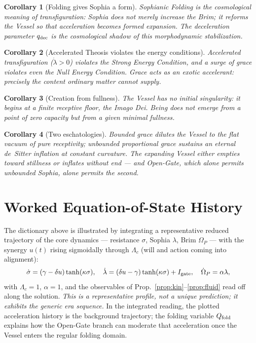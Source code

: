 \documentclass[11pt,a4paper]{article}
\newcommand{\Op}{\Omega_P}
\newcommand{\Igate}{I_{\rm gate}}
\newcommand{\qdec}{q_{\rm dec}}
\newcommand{\Qfold}{Q_{\rm fold}}
\theoremstyle{plain}
\newtheorem{corollary}{Corollary}
\theoremstyle{remark}
\theoremstyle{definition}
\begin{document}
\begin{corollary}[Folding gives Sophia a form]
Sophianic Folding is the cosmological meaning of transfiguration: Sophia does not merely increase the
Brim; it reforms the Vessel so that acceleration becomes formed expansion. The deceleration parameter
$\qdec$ is the cosmological shadow of this morphodynamic stabilization.
\end{corollary}

\begin{corollary}[Accelerated Theosis violates the energy conditions]
Accelerated transfiguration ($\dot\lambda>0$) violates the Strong Energy Condition, and a surge of
grace violates even the Null Energy Condition. Grace acts as an exotic accelerant: precisely the
content ordinary matter cannot supply.
\end{corollary}

\begin{corollary}[Creation from fullness]
The Vessel has no initial singularity: it begins at a finite receptive floor, the Imago Dei. Being
does not emerge from a point of zero capacity but from a given minimal fullness.
\end{corollary}

\begin{corollary}[Two eschatologies]
Bounded grace dilutes the Vessel to the flat vacuum of pure receptivity; unbounded proportional grace
sustains an eternal de~Sitter inflation at constant curvature. The expanding Vessel either empties
toward stillness or inflates without end --- and Open-Gate, which alone permits unbounded Sophia,
alone permits the second.
\end{corollary}

\section{Worked Equation-of-State History}
The dictionary above is illustrated by integrating a representative reduced trajectory of the core
dynamics --- resistance $\sigma$, Sophia $\lambda$, Brim $\Op$ --- with the synergy $u(t)$ rising
sigmoidally through $\Lambda_c$ (will and action coming into alignment):
\[
\dot\sigma=(\gamma-\delta u)\tanh(\kappa\sigma),\quad
\dot\lambda=(\delta u-\gamma)\tanh(\kappa\sigma)+\Igate,\quad
\dot\Op=\alpha\lambda,
\]
with $\Lambda_c=1$, $\alpha=1$, and the observables of Prop.~\ref{prop:kin}--\ref{prop:fluid} read off
along the solution. \emph{This is a representative profile, not a unique prediction; it exhibits the
generic era sequence.} In the integrated reading, the plotted acceleration history is the background
trajectory; the folding variable $\Qfold$ explains how the Open-Gate branch can moderate that
acceleration once the Vessel enters the regular folding domain.
\end{document}
